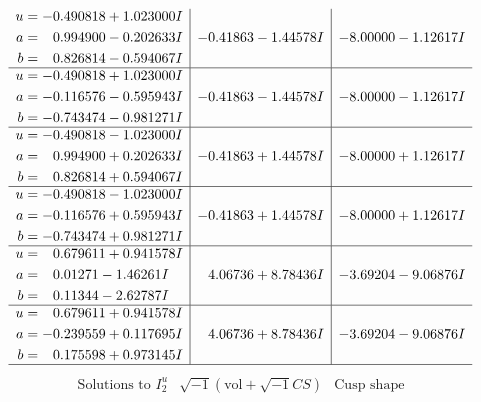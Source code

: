 \documentclass[1p]{elsarticle_modified}
\theoremstyle{definition}
\newcommand{\I}{\sqrt{-1}}
\begin{document}
$$\begin{array}{c|c|c}
\begin{aligned}
u &= -0.490818 + 1.023000 I \\
a &= \phantom{-}0.994900 - 0.202633 I \\
b &= \phantom{-}0.826814 - 0.594067 I\end{aligned}
 & -0.41863 - 1.44578 I & -8.00000 - 1.12617 I \\ \hline\begin{aligned}
u &= -0.490818 + 1.023000 I \\
a &= -0.116576 - 0.595943 I \\
b &= -0.743474 - 0.981271 I\end{aligned}
 & -0.41863 - 1.44578 I & -8.00000 - 1.12617 I \\ \hline\begin{aligned}
u &= -0.490818 - 1.023000 I \\
a &= \phantom{-}0.994900 + 0.202633 I \\
b &= \phantom{-}0.826814 + 0.594067 I\end{aligned}
 & -0.41863 + 1.44578 I & -8.00000 + 1.12617 I \\ \hline\begin{aligned}
u &= -0.490818 - 1.023000 I \\
a &= -0.116576 + 0.595943 I \\
b &= -0.743474 + 0.981271 I\end{aligned}
 & -0.41863 + 1.44578 I & -8.00000 + 1.12617 I \\ \hline\begin{aligned}
u &= \phantom{-}0.679611 + 0.941578 I \\
a &= \phantom{-}0.01271 - 1.46261 I \\
b &= \phantom{-}0.11344 - 2.62787 I\end{aligned}
 & \phantom{-}4.06736 + 8.78436 I & -3.69204 - 9.06876 I \\ \hline\begin{aligned}
u &= \phantom{-}0.679611 + 0.941578 I \\
a &= -0.239559 + 0.117695 I \\
b &= \phantom{-}0.175598 + 0.973145 I\end{aligned}
 & \phantom{-}4.06736 + 8.78436 I & -3.69204 - 9.06876 I\\
 \hline 
 \end{array}$$\newpage$$\begin{array}{c|c|c}  
\text{Solutions to }I^u_{2}& \I (\text{vol} + \sqrt{-1}CS) & \text{Cusp shape}\\
 \hline 
\begin{aligned}

\end{aligned}
\end{array}$$
\end{document}

